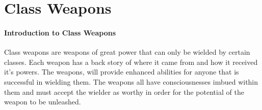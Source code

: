 \chapter{Class Weapons} \label{Weapons}

\subsubsection{Introduction to Class Weapons}

Class weapons are weapons of great power that can only be wielded by certain classes. Each weapon has a back story of where it came from and how it received it's powers. The weapons, will provide enhanced abilities for anyone that is successful in wielding them. The weapons all have consciousnesses imbued within them and must accept the wielder as worthy in order for the potential of the weapon to be unleashed.  













